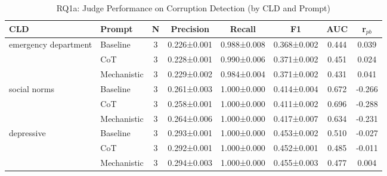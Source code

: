 \begin{table}[htbp]
\centering
\caption{RQ1a: Judge Performance on Corruption Detection (by CLD and Prompt)}
\label{tab:rq1a_main}
\begin{tabular}{llcccccc}
\toprule
\textbf{CLD} & \textbf{Prompt} & \textbf{N} & \textbf{Precision} & \textbf{Recall} & \textbf{F1} & \textbf{AUC} & \textbf{r$_{pb}$} \\
\midrule
emergency department & Baseline & 3 & 0.226±0.001 & 0.988±0.008 & 0.368±0.002 & 0.444 & 0.039 \\
 & CoT & 3 & 0.228±0.001 & 0.990±0.006 & 0.371±0.002 & 0.451 & 0.024 \\
 & Mechanistic & 3 & 0.229±0.002 & 0.984±0.004 & 0.371±0.002 & 0.431 & 0.041 \\
\midrule
social norms & Baseline & 3 & 0.261±0.003 & 1.000±0.000 & 0.414±0.004 & 0.672 & -0.266 \\
 & CoT & 3 & 0.258±0.001 & 1.000±0.000 & 0.411±0.002 & 0.696 & -0.288 \\
 & Mechanistic & 3 & 0.264±0.006 & 1.000±0.000 & 0.417±0.007 & 0.634 & -0.231 \\
\midrule
depressive & Baseline & 3 & 0.293±0.001 & 1.000±0.000 & 0.453±0.002 & 0.510 & -0.027 \\
 & CoT & 3 & 0.292±0.001 & 1.000±0.000 & 0.452±0.001 & 0.485 & -0.011 \\
 & Mechanistic & 3 & 0.294±0.003 & 1.000±0.000 & 0.455±0.003 & 0.477 & 0.004 \\
\midrule
\bottomrule
\end{tabular}
\end{table}